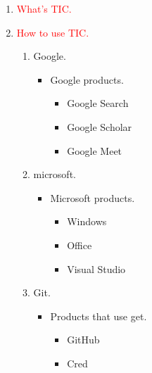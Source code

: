 \documentclass[a4paper,11pt]{report}
\begin{document}
\begin{enumerate}
    \item \large{\textcolor{red}{What's TIC.}}


    \item \large{\textcolor{red}{How to use TIC.}}
    \begin{enumerate}
        \item Google.
                \begin{itemize}
                    \item Google products.
                         \begin{itemize}
                             \item Google Search
                             \item Google Scholar
                             \item Google Meet
                             
                         \end{itemize}
                \end{itemize}
        \item microsoft.
                     \begin{itemize}
                         \item Microsoft products.
                         \begin{itemize}
                             \item Windows
                             \item Office
                             \item Visual Studio
                             
                         \end{itemize}
                     \end{itemize}
        \item Git.
                 \begin{itemize}
                     \item Products that use get.
                     \begin{itemize}
                             \item GitHub
                             \item Cred
                             

\end{itemize}
\end{itemize}
\end{enumerate}
\end{enumerate}
\end{document}
